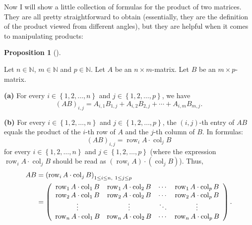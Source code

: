 \documentclass[numbers=enddot,12pt,final,onecolumn,notitlepage]{scrartcl}%
\theoremstyle{definition}
\newtheorem{prop}[theo]{Proposition}
\newenvironment{proposition}[1][]
{\begin{prop}[#1]\begin{leftbar}}
{\end{leftbar}\end{prop}}
\begin{document}
Now I will show a little collection of formulas for the product of two
matrices. They are all pretty straightforward to obtain (essentially, they are
the definition of the product viewed from different angles), but they are
helpful when it comes to manipulating products:

\begin{proposition}
\label{prop.matrix-prod.rc}Let $n\in\mathbb{N}$, $m\in\mathbb{N}$ and
$p\in\mathbb{N}$. Let $A$ be an $n\times m$-matrix. Let $B$ be an $m\times p$-matrix.

\textbf{(a)} For every $i\in\left\{  1,2,\ldots,n\right\}  $ and $j\in\left\{
1,2,\ldots,p\right\}  $, we have%
\[
\left(  AB\right)  _{i,j}=A_{i,1}B_{1,j}+A_{i,2}B_{2,j}+\cdots+A_{i,m}%
B_{m,j}.
\]


\textbf{(b)} For every $i\in\left\{  1,2,\ldots,n\right\}  $ and $j\in\left\{
1,2,\ldots,p\right\}  $, the $\left(  i,j\right)  $-th entry of $AB$ equals
the product of the $i$-th row of $A$ and the $j$-th column of $B$. In
formulas:%
\begin{equation}
\left(  AB\right)  _{i,j}=\operatorname*{row}\nolimits_{i}A\cdot
\operatorname*{col}\nolimits_{j}B \label{eq.prop.matrix-prod.rc.1}%
\end{equation}
for every $i\in\left\{  1,2,\ldots,n\right\}  $ and $j\in\left\{
1,2,\ldots,p\right\}  $ (where the expression $\operatorname*{row}%
\nolimits_{i}A\cdot\operatorname*{col}\nolimits_{j}B$ should be read as
$\left(  \operatorname*{row}\nolimits_{i}A\right)  \cdot\left(
\operatorname*{col}\nolimits_{j}B\right)  $). Thus,
\begin{align*}
AB  &  =\left(  \operatorname*{row}\nolimits_{i}A\cdot\operatorname*{col}%
\nolimits_{j}B\right)  _{1\leq i\leq n,\ 1\leq j\leq p}\\
&  =\left(
\begin{array}
[c]{cccc}%
\operatorname*{row}\nolimits_{1}A\cdot\operatorname*{col}\nolimits_{1}B &
\operatorname*{row}\nolimits_{1}A\cdot\operatorname*{col}\nolimits_{2}B &
\cdots & \operatorname*{row}\nolimits_{1}A\cdot\operatorname*{col}%
\nolimits_{p}B\\
\operatorname*{row}\nolimits_{2}A\cdot\operatorname*{col}\nolimits_{1}B &
\operatorname*{row}\nolimits_{2}A\cdot\operatorname*{col}\nolimits_{2}B &
\cdots & \operatorname*{row}\nolimits_{2}A\cdot\operatorname*{col}%
\nolimits_{p}B\\
\vdots & \vdots & \ddots & \vdots\\
\operatorname*{row}\nolimits_{n}A\cdot\operatorname*{col}\nolimits_{1}B &
\operatorname*{row}\nolimits_{n}A\cdot\operatorname*{col}\nolimits_{2}B &
\cdots & \operatorname*{row}\nolimits_{n}A\cdot\operatorname*{col}%
\nolimits_{p}B
\end{array}
\right)  .
\end{align*}



\end{proposition}
\end{document}
